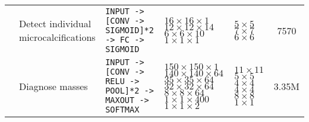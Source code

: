 \begin{landscape}
\begin{longtable}{cp{3.4cm}p{7cm}p{2.7cm}p{1.3cm}c}
	\cite{Ge2006}& Detect individual microcalcifications & \texttt{INPUT -> [CONV -> SIGMOID]*2 -> FC -> SIGMOID} & $16\times 16 \times 1$ \newline $12 \times 12 \times 14$\newline $6\times 6 \times 10$\newline $1 \times 1 \times 1$ & $5 \times 5$\newline $7 \times 7$ \newline $6 \times 6$& 7570 \\
	\cite{Arevalo2016}& Diagnose masses & \texttt{INPUT -> [CONV -> RELU -> POOL]*2 -> MAXOUT -> SOFTMAX} & $150\times 150 \times 1$ \newline $140 \times 140 \times 64$\newline $35\times 35 \times 64$\newline $32 \times 32 \times 64$ \newline $8 \times 8 \times 64$ \newline $1 \times 1 \times 400$ \newline $1 \times 1 \times 2$ & $11 \times 11$ \newline $5 \times 5$ \newline $4 \times 4$ \newline $4 \times 4$ \newline $8 \times 8$ \newline $1 \times 1$ & 3.35M \\

\end{longtable}
\end{landscape}
